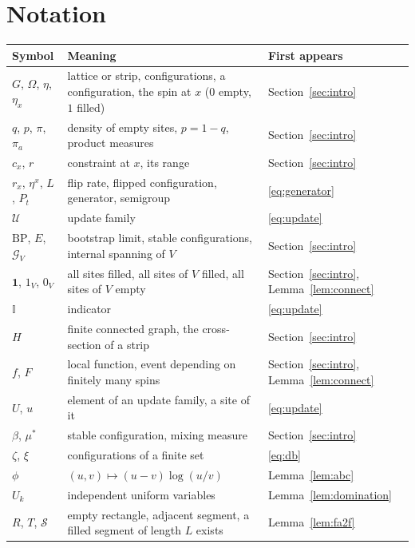 \documentclass[11pt]{amsart}
\theoremstyle{remark}
\newcommand{\cU}{\mathcal{U}}
\newcommand{\BP}{\mathrm{BP}}
\begin{document}
\appendix
\section{Notation}\label{app:notation}

\begin{center}
\begin{tabular}{p{3.3cm}p{7.6cm}p{3.2cm}}
\toprule
Symbol & Meaning & First appears\\
\midrule
$G$, $\Omega$, $\eta$, $\eta_x$ & lattice or strip, configurations, a configuration, the spin at $x$ ($0$ empty, $1$ filled) & Section~\ref{sec:intro}\\
$q$, $p$, $\pi$, $\pi_a$ & density of empty sites, $p=1-q$, product measures & Section~\ref{sec:intro}\\
$c_x$, $r$ & constraint at $x$, its range & Section~\ref{sec:intro}\\
$r_x$, $\eta^x$, $L$, $P_t$ & flip rate, flipped configuration, generator, semigroup & \eqref{eq:generator}\\
$\cU$ & update family & \eqref{eq:update}\\
$\BP$, $E$, $\mathcal G_V$ & bootstrap limit, stable configurations, internal spanning of $V$ & Section~\ref{sec:intro}\\
$\mathbf 1$, $1_V$, $0_V$ & all sites filled, all sites of $V$ filled, all sites of $V$ empty & Section~\ref{sec:intro}, Lemma~\ref{lem:connect}\\
$\mathbb I$ & indicator & \eqref{eq:update}\\
$H$ & finite connected graph, the cross-section of a strip & Section~\ref{sec:intro}\\
$f$, $F$ & local function, event depending on finitely many spins & Section~\ref{sec:intro}, Lemma~\ref{lem:connect}\\
$U$, $u$ & element of an update family, a site of it & \eqref{eq:update}\\
$\beta$, $\mu^*$ & stable configuration, mixing measure & Section~\ref{sec:intro}\\
$\zeta$, $\xi$ & configurations of a finite set & \eqref{eq:db}\\
$\phi$ & $(u,v)\mapsto(u-v)\log(u/v)$ & Lemma~\ref{lem:abc}\\
$U_k$ & independent uniform variables & Lemma~\ref{lem:domination}\\
$R$, $T$, $\mathcal S$ & empty rectangle, adjacent segment, a filled segment of length $L$ exists & Lemma~\ref{lem:fa2f}\\

\end{tabular}
\end{center}
\end{document}
